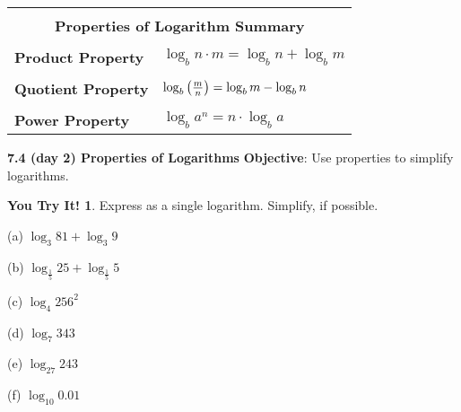 \documentclass{report}
\theoremstyle{definition}
\newtheorem{youtry}{\bf You Try It!}
\begin{document}
\begin{center}
	\large
	\begin{tabular}[t]{|l|l|}
		\hline
		\multicolumn{2}{|c|}{}\\
		\multicolumn{2}{|c|}{\textbf{ Properties of Logarithm  Summary}}\\
		\hline
		&\\
		\textbf{Product Property} & $\log_b n\cdot m = \log_b n + \log_b m$ \\
		\hline
		&\\
		\textbf{Quotient Property} & $\log_b \big{(}\frac{m}{n}\big{)} = \log_b m - \log_b n$\\
		\hline 
		&\\
		\textbf{Power Property} & $\log_b a^n = n\cdot \log_b a$\\
		\hline
	\end{tabular}
	\normalsize
\end{center}

\vfill

 \noindent{}
 \newpage

\noindent\Large{\textbf{7.4 (day 2) Properties of Logarithms}} 
\indent\hfill\small\noindent \textbf{Objective}: Use properties to simplify logarithms.  \normalsize\\

\begin{youtry}
Express as a single logarithm. Simplify, if possible.
\end{youtry}

\begin{minipage}[t]{0.3\linewidth}
 (a) $\log_3 81 + \log_3 9$
\end{minipage}
\hfill
\begin{minipage}[t]{0.3\linewidth}
 (b) $ \log_\frac{1}{5} 25 + \log_\frac{1}{5} 5$
\end{minipage}
\hfill
\begin{minipage}[t]{0.3\linewidth}
 (c) $\log_4 256^2$
\end{minipage}
\vfill

\begin{minipage}[t]{0.3\linewidth}
 (d) $\log_7 343$
\end{minipage}
\hfill
\begin{minipage}[t]{0.3\linewidth}
 (e) $\log_27 243$
\end{minipage}
\hfill
\begin{minipage}[t]{0.3\linewidth}
 (f) $\log_10 0.01$
\end{minipage}
\vfill
\end{document}
